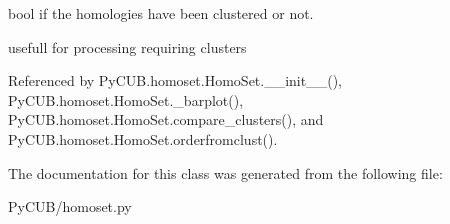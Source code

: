 bool if the homologies have been clustered or not. 

usefull for processing requiring clusters 

Referenced by Py\+C\+U\+B.\+homoset.\+Homo\+Set.\+\_\+\+\_\+init\+\_\+\+\_\+(), Py\+C\+U\+B.\+homoset.\+Homo\+Set.\+\_\+barplot(), Py\+C\+U\+B.\+homoset.\+Homo\+Set.\+compare\+\_\+clusters(), and Py\+C\+U\+B.\+homoset.\+Homo\+Set.\+orderfromclust().



The documentation for this class was generated from the following file\+:\begin{DoxyCompactItemize}
\item 
Py\+C\+U\+B/homoset.\+py\end{DoxyCompactItemize}
